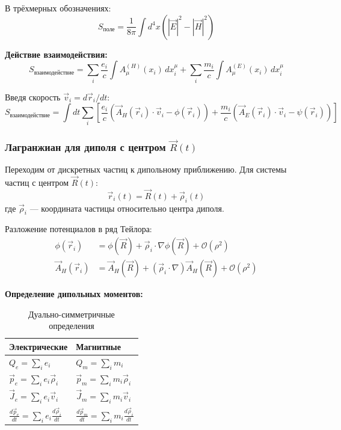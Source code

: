 \documentclass[a4paper,12pt]{article}
\begin{document}
В трёхмерных обозначениях:
\begin{equation}
S_{\text{поле}} = \frac{1}{8\pi} \int d^4x \left( |\vec{E}|^2 - |\vec{H}|^2 \right)
\label{eq:action_field_3d}
\end{equation}

\textbf{Действие взаимодействия:}
\begin{equation}
S_{\text{взаимодействие}} = \sum_i \frac{e_i}{c} \int A^{(H)}_\mu(x_i) \, dx^\mu_i + \sum_i \frac{m_i}{c} \int A^{(E)}_\mu(x_i) \, dx^\mu_i
\label{eq:action_interaction}
\end{equation}

Введя скорость $\vec{v}_i = d\vec{r}_i/dt$:
\begin{equation}
S_{\text{взаимодействие}} = \int dt \sum_i \left[ \frac{e_i}{c} \left( \vec{A}_H(\vec{r}_i) \cdot \vec{v}_i - \phi(\vec{r}_i) \right) + \frac{m_i}{c} \left( \vec{A}_E(\vec{r}_i) \cdot \vec{v}_i - \psi(\vec{r}_i) \right) \right]
\label{eq:action_interaction_explicit}
\end{equation}

\subsubsection{Лагранжиан для диполя с центром $\vec{R}(t)$}

Переходим от дискретных частиц к дипольному приближению. Для системы частиц с центром $\vec{R}(t)$:
\begin{equation}
\vec{r}_i(t) = \vec{R}(t) + \vec{\rho}_i(t)
\label{eq:dipole_decomposition}
\end{equation}
где $\vec{\rho}_i$ --- координата частицы относительно центра диполя.

Разложение потенциалов в ряд Тейлора:
\begin{align}
\phi(\vec{r}_i) &= \phi(\vec{R}) + \vec{\rho}_i \cdot \nabla\phi(\vec{R}) + \mathcal{O}(\rho^2) \\
\vec{A}_H(\vec{r}_i) &= \vec{A}_H(\vec{R}) + (\vec{\rho}_i \cdot \nabla)\vec{A}_H(\vec{R}) + \mathcal{O}(\rho^2)
\end{align}

\textbf{Определение дипольных моментов:}

\begin{table}[h]
\centering
\caption{Дуально-симметричные определения}
\label{tab:dipole_definitions}
\begin{tabular}{@{}ll@{}}
\toprule
\textbf{Электрические} & \textbf{Магнитные} \\
\midrule
$Q_e = \sum_i e_i$ & $Q_m = \sum_i m_i$ \\
$\vec{p}_e = \sum_i e_i \vec{\rho}_i$ & $\vec{p}_m = \sum_i m_i \vec{\rho}_i$ \\
$\vec{J}_e = \sum_i e_i \vec{v}_i$ & $\vec{J}_m = \sum_i m_i \vec{v}_i$ \\
$\frac{d\vec{p}_e}{dt} = \sum_i e_i \frac{d\vec{\rho}_i}{dt}$ & $\frac{d\vec{p}_m}{dt} = \sum_i m_i \frac{d\vec{\rho}_i}{dt}$ \\
\bottomrule
\end{tabular}
\end{table}
\end{document}
